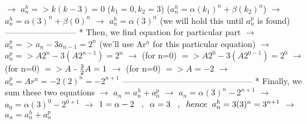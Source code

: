 \documentclass[a4 paper]{article}
\numberwithin{equation}{section}
\newcommand{\0}{\mathbf{0}}
\begin{document}
$\to$ $a_n^h => k(k-3) = 0$  ($k_1 = 0, k_2 = 3$) ($a_n^h = \alpha(k_1)^n + \beta(k_2)^n$)
\newline \newline
$\to$ $a_n^h = \alpha(3)^n + \beta(0)^n$
\newline \newline
$\to$ $a_n^h = \alpha(3)^n$ (we will hold this until $a_n^p$ is found)
\newline -------------------------- \newline
* Then, we find equation for particular part 
\newline \newline
$\to$ $a_n^p => a_n - 3a_{n-1} = 2^n$ (we'll use Ar$^n$ for this particular equation)
\newline \newline
$\to$ $a_n^p => A2^n - 3(A2^{n-1}) = 2^n$
\newline \newline
$\to$ (for n=0) $=> A2^0 - 3(A2^{0-1}) = 2^0$
\newline \newline
$\to$ (for n=0) $=> A$ - ${3\over2}A= 1$
\newline \newline
$\to$ (for n=0) $=> A = -2$
\newline \newline
$\to$ $a_n^p = Ar^n = -2(2)^n = -2^{n+1}$
\newline ----------------------------------------------- \newline
* Finally, we sum these two equations
\newline \newline
$\to$ $a_n = a_n^h + a_n^p$
\newline \newline
$\to$ $a_n = \alpha(3)^n - 2^{n+1}$
\newline \newline
$\to$ $a_0 = \alpha(3)^0 - 2^{0+1}$
\newline \newline
$\to$ $1 = \alpha - 2 \hspace{3mm}, \hspace{2mm}\alpha = 3  \hspace{3mm}, \hspace{2mm} hence\hspace{2mm}a_n^h = 3(3)^n = 3^{n+1}$
\newline \newline
$\to$ $a_n = a_n^h + a_n^p$
\newline \newline
\end{document}

